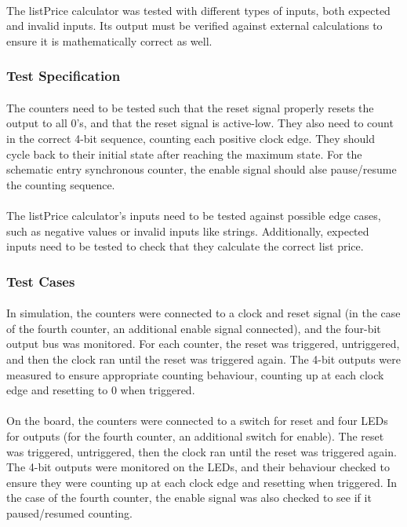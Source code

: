 \documentclass{article}
\begin{document}
	  	\paragraph{} The listPrice calculator was tested with different types of inputs, both expected and invalid inputs. Its output must be verified against external calculations to ensure it is mathematically correct as well.

	  \subsubsection{Test Specification}
	  	\paragraph{} The counters need to be tested such that the reset signal properly resets the output to all 0's, and that the reset signal is active-low. They also need to count in the correct 4-bit sequence, counting each positive clock edge. They should cycle back to their initial state after reaching the maximum state. For the schematic entry synchronous counter, the enable signal should alse pause/resume the counting sequence.

	  	\paragraph{} The listPrice calculator's inputs need to be tested against possible edge cases, such as negative values or invalid inputs like strings. Additionally, expected inputs need to be tested to check that they calculate the correct list price.

	  \subsubsection{Test Cases}
	  	\paragraph{} In simulation, the counters were connected to a clock and reset signal (in the case of the fourth counter, an additional enable signal connected), and the four-bit output bus was monitored. For each counter, the reset was triggered, untriggered, and then the clock ran until the reset was triggered again. The 4-bit outputs were measured to ensure appropriate counting behaviour, counting up at each clock edge and resetting to 0 when triggered.

	  	\paragraph{} On the board, the counters were connected to a switch for reset and four LEDs for outputs (for the fourth counter, an additional switch for enable). The reset was triggered, untriggered, then the clock ran until the reset was triggered again. The 4-bit outputs were monitored on the LEDs, and their behaviour checked to ensure they were counting up at each clock edge and resetting when triggered. In the case of the fourth counter, the enable signal was also checked to see if it paused/resumed counting.
\end{document}
